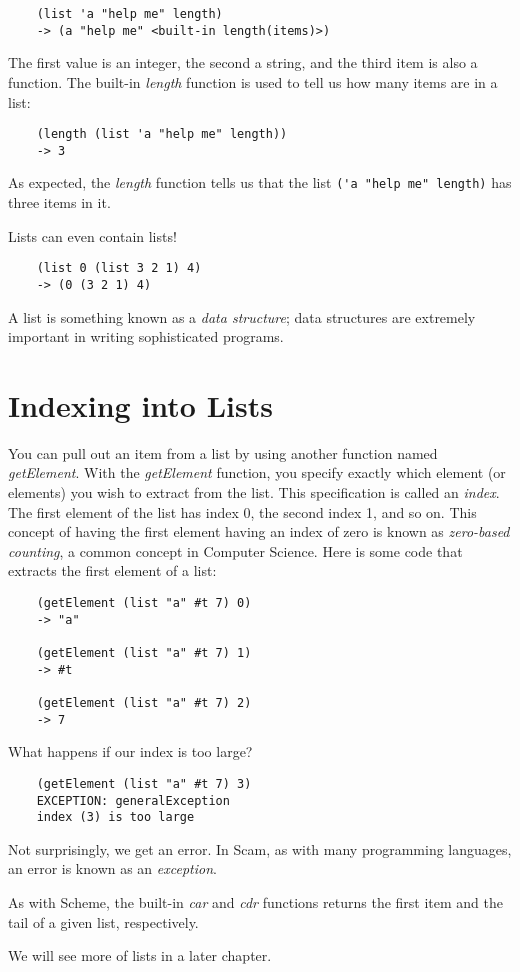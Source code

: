 \begin{verbatim}
    (list 'a "help me" length)
    -> (a "help me" <built-in length(items)>)
\end{verbatim}

The first value is an integer, the second a string,
and the third item is also a function. 
The built-in {\it length} function
is used to tell us how many items are in a list:

\begin{verbatim}
    (length (list 'a "help me" length))
    -> 3
\end{verbatim}

As expected, the {\it length} function tells us that the list
\verb!('a "help me" length)! has three items in it.

Lists can even contain lists!

\begin{verbatim}
    (list 0 (list 3 2 1) 4)
    -> (0 (3 2 1) 4)
\end{verbatim}

A list is something known as a {\it data structure};
data structures are extremely important in writing
sophisticated programs.

\section{Indexing into Lists}

You can pull out an item from a list by using another function
named {\it getElement}.
With the {\it getElement} function,
you specify exactly which element (or elements)
you wish to extract from the list. This specification is called an
{\it index}. The first element of the list has index 0, the second
index 1, and so on. This concept of having the first element having
an index of zero is known as {\it zero-based counting}, a common concept
in Computer Science. Here is some code that extracts the first element
of a list:

\begin{verbatim}
    (getElement (list "a" #t 7) 0)
    -> "a"

    (getElement (list "a" #t 7) 1)
    -> #t

    (getElement (list "a" #t 7) 2)
    -> 7
\end{verbatim}

What happens if our index is too large?

\begin{verbatim}
    (getElement (list "a" #t 7) 3)
    EXCEPTION: generalException
    index (3) is too large
\end{verbatim}

Not surprisingly, we get an error.
In Scam, as with many programming languages, an error is known
as an {\it exception}.

As with Scheme, the built-in {\it car} and {\it cdr} functions
returns the first item and the tail of a given list, respectively.

We will see more of lists in a later chapter.
